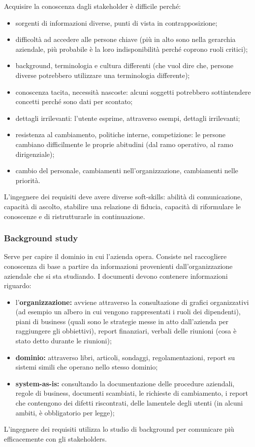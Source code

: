 \documentclass[italian]{article}
\begin{document}
	 Acquisire la conoscenza dagli stakeholder è difficile perché:
	 \begin{itemize}
	 	\item sorgenti di informazioni diverse, punti di vista in contrapposizione;
	 	\item difficoltà ad accedere alle persone chiave (più in alto sono nella gerarchia aziendale, più probabile è la loro indisponibilità perché coprono ruoli critici);
	 	\item background, terminologia e cultura differenti (che vuol dire che, persone diverse potrebbero utilizzare una terminologia differente);
	 	\item conoscenza tacita, necessità nascoste: alcuni soggetti potrebbero sottintendere concetti perché sono dati per scontato;
	 	\item dettagli irrilevanti: l'utente esprime, attraverso esempi, dettagli irrilevanti;
	 	\item resistenza al cambiamento, politiche interne, competizione: le persone cambiano difficilmente le proprie abitudini (dal ramo operativo, al ramo dirigenziale);
	 	\item cambio del personale, cambiamenti nell'organizzazione, cambiamenti nelle priorità.
	 \end{itemize}
	 L'ingegnere dei requisiti deve avere diverse soft-skills: abilità di comunicazione, capacità di ascolto, stabilire una relazione di fiducia, capacità di riformulare le conoscenze e di ristrutturarle in continuazione.

	 \subsubsection{Background study} Serve per capire il dominio in cui l'azienda opera. Consiste nel raccogliere conoscenza di base a partire da informazioni provenienti dall'organizzazione aziendale che si sta studiando. I documenti devono contenere informazioni riguardo:
	 \begin{itemize}
	 	\item l'\textbf{organizzazione:} avviene attraverso la consultazione di grafici organizzativi (ad esempio un albero in cui vengono rappresentati i ruoli dei dipendenti), piani di business (quali sono le strategie messe in atto dall'azienda per raggiungere gli obbiettivi), report finanziari, verbali delle riunioni (cosa è stato detto durante le riunioni);
	 	\item \textbf{dominio:} attraverso libri, articoli, sondaggi, regolamentazioni, report su sistemi simili che operano nello stesso dominio;
	 	\item \textbf{system-as-is:} consultando la documentazione delle procedure aziendali, regole di business, documenti scambiati, le richieste di cambiamento, i report che contengono dei difetti riscontrati, delle lamentele degli utenti (in alcuni ambiti, è obbligatorio per legge);
	 \end{itemize}
	 L'ingegnere dei requisiti utilizza lo studio di background per comunicare più efficacemente con gli stakeholders.
\end{document}
